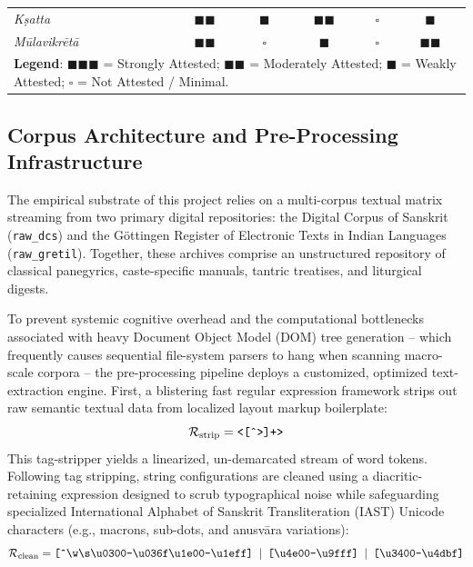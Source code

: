 \documentclass[11pt,twoside,letterpaper]{article}
\begin{document}
\begin{longtable}{lccccc}
\textit{Kṣatta}       & $\blacksquare\blacksquare$ & $\blacksquare$ & $\blacksquare\blacksquare$ & $\square$ & $\blacksquare$ \\
\textit{Mūlavikrētā}  & $\blacksquare\blacksquare$ & $\square$ & $\blacksquare$ & $\square$ & $\blacksquare\blacksquare$ \\
\hline
\multicolumn{6}{l}{\small \textbf{Legend}: $\blacksquare\blacksquare\blacksquare$ = Strongly Attested; $\blacksquare\blacksquare$ = Moderately Attested; $\blacksquare$ = Weakly Attested; $\square$ = Not Attested / Minimal.}
\end{longtable}


\subsection{Corpus Architecture and Pre-Processing Infrastructure}
The empirical substrate of this project relies on a multi-corpus textual matrix streaming from two primary digital repositories: the Digital Corpus of Sanskrit (\texttt{raw\_dcs}) and the Göttingen Register of Electronic Texts in Indian Languages (\texttt{raw\_gretil}). Together, these archives comprise an unstructured repository of classical panegyrics, caste-specific manuals, tantric treatises, and liturgical digests.

To prevent systemic cognitive overhead and the computational bottlenecks associated with heavy Document Object Model (DOM) tree generation -- which frequently causes sequential file-system parsers to hang when scanning macro-scale corpora -- the pre-processing pipeline deploys a customized, optimized text-extraction engine. First, a blistering fast regular expression framework strips out raw semantic textual data from localized layout markup boilerplate:
\begin{equation}
\mathcal{R}_{\text{strip}} = \text{\texttt{<[\^{}>]+>}}
\end{equation}
This tag-stripper yields a linearized, un-demarcated stream of word tokens. Following tag stripping, string configurations are cleaned using a diacritic-retaining expression designed to scrub typographical noise while safeguarding specialized International Alphabet of Sanskrit Transliteration (IAST) Unicode characters (e.g., macrons, sub-dots, and anusvāra variations):
\begin{equation}
\mathcal{R}_{\text{clean}} = \text{\texttt{[\^{}\textbackslash w\textbackslash s\textbackslash u0300-\textbackslash u036f\textbackslash u1e00-\textbackslash u1eff] \(\vert\) [\textbackslash u4e00-\textbackslash u9fff] \(\vert\) [\textbackslash u3400-\textbackslash u4dbf]}}
\end{equation}
\end{document}
